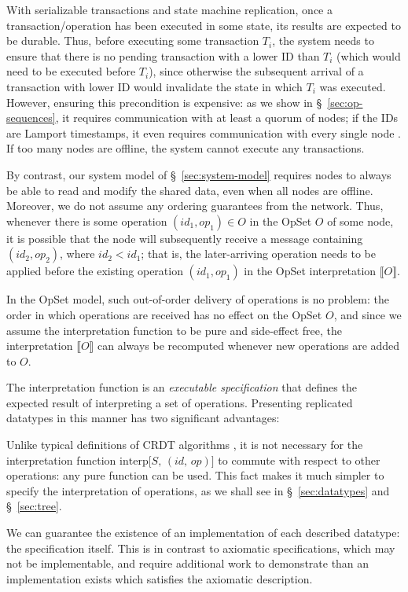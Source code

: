 With serializable transactions and state machine replication, once a transaction/operation has been executed in some state, its results are expected to be durable.
Thus, before executing some transaction $T_i$, the system needs to ensure that there is no pending transaction with a lower ID than $T_i$ (which would need to be executed before $T_i$), since otherwise the subsequent arrival of a transaction with lower ID would invalidate the state in which $T_i$ was executed.
However, ensuring this precondition is expensive: as we show in \S~\ref{sec:op-sequences}, it requires communication with at least a quorum of nodes; if the IDs are Lamport timestamps, it even requires communication with every single node \cite{Lamport:1978jq}.
If too many nodes are offline, the system cannot execute any transactions.

By contrast, our system model of \S~\ref{sec:system-model} requires nodes to always be able to read and modify the shared data, even when all nodes are offline.
Moreover, we do not assume any ordering guarantees from the network.
Thus, whenever there is some operation $(\mathit{id}_1, \mathit{op}_1) \in O$ in the OpSet $O$ of some node, it is possible that the node will subsequently receive a message containing $(\mathit{id}_2, \mathit{op}_2)$, where $\mathit{id}_2 < \mathit{id}_1$; that is, the later-arriving operation needs to be applied before the existing operation $(\mathit{id}_1, \mathit{op}_1)$ in the OpSet interpretation $\llbracket O \rrbracket$.

In the OpSet model, such out-of-order delivery of operations is no problem: the order in which operations are received has no effect on the OpSet $O$, and since we assume the interpretation function to be pure and side-effect free, the interpretation $\llbracket O \rrbracket$ can always be recomputed whenever new operations are added to $O$.

The interpretation function is an \emph{executable specification} that defines the expected result of interpreting a set of operations.
Presenting replicated datatypes in this manner has two significant advantages:
\begin{enumerate*}
\item
Unlike typical definitions of CRDT algorithms \cite{Shapiro:2011wy,Shapiro:2011un}, it is not necessary for the interpretation function $\mathrm{interp}\big[S,\, (\mathit{id},\, \mathit{op})\big]$ to commute with respect to other operations: any pure function can be used.
This fact makes it much simpler to specify the interpretation of operations, as we shall see in \S~\ref{sec:datatypes} and \S~\ref{sec:tree}.
\item
We can guarantee the existence of an implementation of each described datatype: the specification itself.
This is in contrast to axiomatic specifications, which may not be implementable, and require additional work to demonstrate than an implementation exists which satisfies the axiomatic description.
\end{enumerate*}

